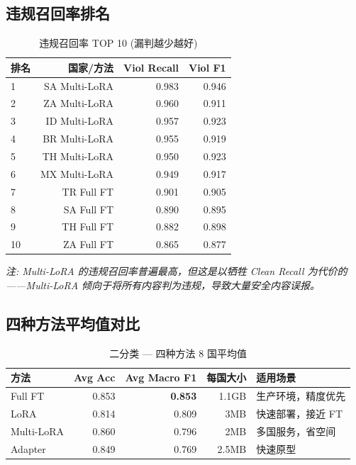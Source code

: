 \documentclass[11pt,a4paper]{article}
\begin{document}
\subsection{违规召回率排名}

\begin{table}[h]\centering
\caption{违规召回率 TOP 10 (漏判越少越好)}\label{tab:viol-recall}
\begin{tabular}{@{}lrrr@{}}
\toprule
\textbf{排名} & \textbf{国家/方法} & \textbf{Viol Recall} & \textbf{Viol F1} \\
\midrule
1 & SA Multi-LoRA & 0.983 & 0.946 \\
2 & ZA Multi-LoRA & 0.960 & 0.911 \\
3 & ID Multi-LoRA & 0.957 & 0.923 \\
4 & BR Multi-LoRA & 0.955 & 0.919 \\
5 & TH Multi-LoRA & 0.950 & 0.923 \\
6 & MX Multi-LoRA & 0.949 & 0.917 \\
7 & TR Full FT & 0.901 & 0.905 \\
8 & SA Full FT & 0.890 & 0.895 \\
9 & TH Full FT & 0.882 & 0.898 \\
10 & ZA Full FT & 0.865 & 0.877 \\
\bottomrule
\end{tabular}
\end{table}

\textit{注: Multi-LoRA 的违规召回率普遍最高，但这是以牺牲 Clean Recall 为代价的
——Multi-LoRA 倾向于将所有内容判为违规，导致大量安全内容误报。}

\subsection{四种方法平均值对比}

\begin{table}[h]\centering
\caption{二分类 — 四种方法 8 国平均值}\label{tab:avg}
\begin{tabular}{@{}lrrrl@{}}
\toprule
\textbf{方法} & \textbf{Avg Acc} & \textbf{Avg Macro F1} & \textbf{每国大小} & \textbf{适用场景} \\
\midrule
Full FT & 0.853 & \textbf{0.853} & 1.1GB & 生产环境，精度优先 \\
LoRA & 0.814 & 0.809 & 3MB & 快速部署，接近 FT \\
Multi-LoRA & 0.860 & 0.796 & 2MB & 多国服务，省空间 \\
Adapter & 0.849 & 0.769 & 2.5MB & 快速原型 \\
\bottomrule
\end{tabular}
\end{table}
\end{document}
